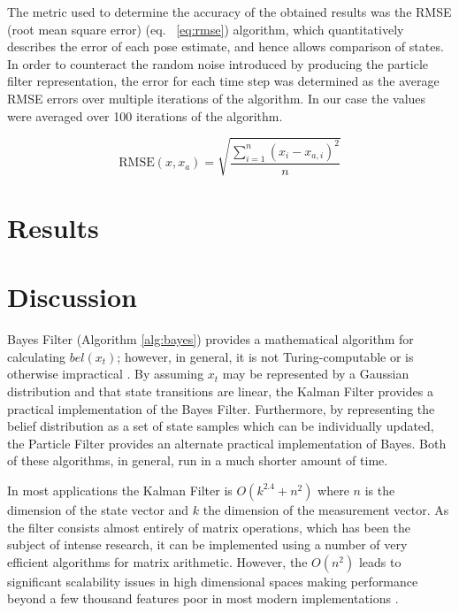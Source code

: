 \documentclass[english]{article}
\begin{document}
The metric used to determine the accuracy of the obtained results was the RMSE (root mean square error) (eq. ~\ref{eq:rmse}) algorithm, which quantitatively describes the error of each pose estimate, and hence allows comparison of states. In order to counteract the random noise introduced by producing the particle filter representation, the error for each time step was determined as the average RMSE errors over multiple iterations of the algorithm. In our case the values were averaged over 100 iterations of the algorithm.

\begin{equation}
\label{eq:rmse}
\mathrm{RMSE}(x, x_a) = \sqrt{\frac{\sum^n_{i=1} \left(x_i - x_{a,i}\right)^2}{n}}
\end{equation}


\section{Results}

\section{Discussion}

Bayes Filter (Algorithm \ref{alg:bayes}) provides a mathematical algorithm for calculating $bel(x_t)$; however, in general, it is not Turing-computable or is otherwise impractical \cite{probrob}. By assuming $x_t$ may be represented by a Gaussian distribution and that state transitions are linear, the Kalman Filter provides a practical implementation of the Bayes Filter. Furthermore, by representing the belief distribution as a set of state samples which can be individually updated, the Particle Filter provides an alternate practical implementation of Bayes. Both of these algorithms, in general, run in a much shorter amount of time.

In most applications the Kalman Filter is $O(k^{2.4} + n^2)$ where $n$ is the dimension of the state vector and $k$ the dimension of the measurement vector\cite{probrob}. As the filter consists almost entirely of matrix operations, which has been the subject of intense research, it can be implemented using a number of very efficient algorithms for matrix arithmetic. However, the $O(n^2)$ leads to significant scalability issues in high dimensional spaces making performance beyond a few thousand features poor in most modern implementations \cite{Thrun02d}.
\end{document}
